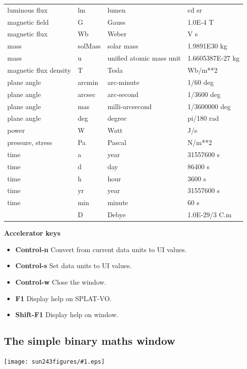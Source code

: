 \documentclass[twoside,11pt]{article}
\newcommand{\htmladdimg}[1]{}
\newcommand{\latexhtml}[2]{#1}
\renewcommand{\_}{\texttt{\symbol{95}}}
\newcommand{\SPLAT}{\textsf{SPLAT-VO}}
\newcommand{\mainfigure}[1]
{\begin{center}
 \latexhtml{\texttt{[image: sun243\_figures/\#1.eps]}}{\htmladdimg{#1.gif}}
 \end{center}
}
\newcommand{\labelitem}[1]{\textbf{#1}}
\newcommand{\subheading}[1]{\textbf{\large{#1}}}
\begin{document}
\begin{center}
\begin{tabular}{|l|l|l|l|}
luminous flux & lm & lumen & cd sr \\
magnetic field & G & Gauss & 1.0E-4 T \\
magnetic flux & Wb & Weber & V s \\
mass & solMass & solar mass & 1.9891E30 kg \\
mass & u & unified atomic mass unit & 1.6605387E-27 kg \\
magnetic flux density & T & Tesla & Wb/m**2 \\
plane angle  & arcmin & arc-minute & 1/60 deg \\
plane angle  & arcsec & arc-second & 1/3600 deg \\
plane angle  & mas & milli-arcsecond & 1/3600000 deg \\
plane angle & deg & degree & pi/180 rad \\
power & W & Watt & J/s \\
pressure, stress & Pa & Pascal & N/m**2 \\
time  & a & year & 31557600 s \\
time  & d & day & 86400 s \\
time  & h & hour & 3600 s \\
time  & yr & year & 31557600 s \\
time  & min & minute & 60 s \\
      & D & Debye & 1.0E-29/3 C.m \\
\hline
\end{tabular}
\end{center}

\subheading{Accelerator keys}

\begin{itemize}
\item \labelitem{Control-n} Convert from current data units to UI values.
\item \labelitem{Control-s} Set data units to UI values.
\item \labelitem{Control-w} Close the window.
\item \labelitem{F1} Display help on \SPLAT.     
\item \labelitem{Shift-F1} Display help on window.
\end{itemize}


\newpage
\subsection{The simple binary maths window}

\mainfigure{binarymathwindow}
\end{document}
